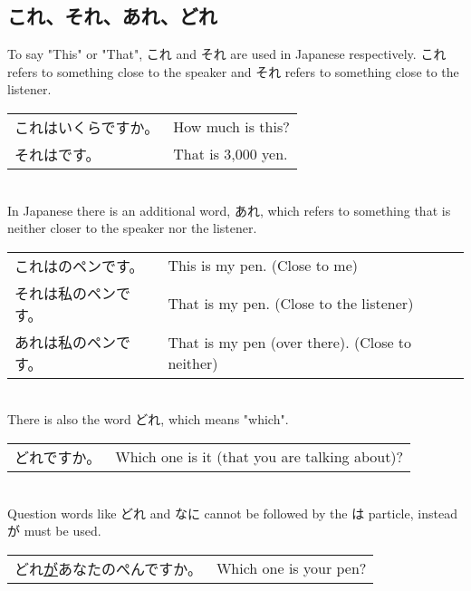 \documentclass{article}
\newenvironment{gex}
{
	\,\\
	\renewcommand{\arraystretch}{1.5}
    \begin{tabular}{m{20em} l}
}
{
	\end{tabular}
	\renewcommand{\arraystretch}{1}
	\\
}
\begin{document}
   \subsection{これ、それ、あれ、どれ}
   To say "This" or "That", これ and それ are used in Japanese respectively. これ refers to something close to the speaker and それ refers to something close to the listener. 
   \begin{gex}
   これはいくらですか。 & How much is this? \\
   それは\ruby{三}{さん}\ruby{千}{ぜん}\ruby{円}{えん}です。 & That is 3,000 yen.
   \end{gex}   
   In Japanese there is an additional word, あれ, which refers to something that is neither closer to the speaker nor the listener.
   \begin{gex}
   これは\ruby{私}{わたし}のペンです。 & This is my pen. (Close to me) \\
   それは私のペンです。 & That is my pen. (Close to the listener) \\
   あれは私のペンです。 & That is my pen (over there). (Close to neither)
   \end{gex}
   There is also the word どれ, which means "which".
   \begin{gex}
   どれですか。 & Which one is it (that you are talking about)?
   \end{gex}
   Question words like どれ and なに cannot be followed by the は particle, instead が must be used.
   \begin{gex}
   どれ\underline{が}あなたのぺんですか。 & Which one is your pen?
   \end{gex}
   
   
\end{document}
